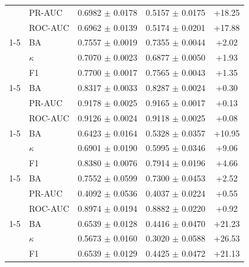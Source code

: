 \begin{table}[tbp]
\begin{tabular}{@{}l l c c c@{}}
 & PR-AUC & 0.6982 $\pm$ 0.0178 & 0.5157 $\pm$ 0.0175 & +18.25 \\
 & ROC-AUC & 0.6962 $\pm$ 0.0139 & 0.5174 $\pm$ 0.0201 & +17.88 \\
\cmidrule(lr){1-5}
\multirow{3}{*}{HMC} & BA & 0.7557 $\pm$ 0.0019 & 0.7355 $\pm$ 0.0044 & +2.02 \\
 & $\kappa$ & 0.7070 $\pm$ 0.0023 & 0.6877 $\pm$ 0.0050 & +1.93 \\
 & F1 & 0.7700 $\pm$ 0.0017 & 0.7565 $\pm$ 0.0043 & +1.35 \\
\cmidrule(lr){1-5}
\multirow{3}{*}{TUAB} & BA & 0.8317 $\pm$ 0.0033 & 0.8287 $\pm$ 0.0024 & +0.30 \\
 & PR-AUC & 0.9178 $\pm$ 0.0025 & 0.9165 $\pm$ 0.0017 & +0.13 \\
 & ROC-AUC & 0.9126 $\pm$ 0.0024 & 0.9118 $\pm$ 0.0025 & +0.08 \\
\cmidrule(lr){1-5}
\multirow{3}{*}{TUEV} & BA & 0.6423 $\pm$ 0.0164 & 0.5328 $\pm$ 0.0357 & +10.95 \\
 & $\kappa$ & 0.6901 $\pm$ 0.0190 & 0.5995 $\pm$ 0.0346 & +9.06 \\
 & F1 & 0.8380 $\pm$ 0.0076 & 0.7914 $\pm$ 0.0196 & +4.66 \\
\cmidrule(lr){1-5}
\multirow{3}{*}{CHB-MIT} & BA & 0.7552 $\pm$ 0.0599 & 0.7300 $\pm$ 0.0453 & +2.52 \\
 & PR-AUC & 0.4092 $\pm$ 0.0536 & 0.4037 $\pm$ 0.0224 & +0.55 \\
 & ROC-AUC & 0.8974 $\pm$ 0.0194 & 0.8882 $\pm$ 0.0220 & +0.92 \\
\cmidrule(lr){1-5}
\multirow{3}{*}{BCIC2020-3} & BA & 0.6539 $\pm$ 0.0128 & 0.4416 $\pm$ 0.0470 & +21.23 \\
 & $\kappa$ & 0.5673 $\pm$ 0.0160 & 0.3020 $\pm$ 0.0588 & +26.53 \\
 & F1 & 0.6539 $\pm$ 0.0129 & 0.4425 $\pm$ 0.0472 & +21.13 \\
\bottomrule\end{tabular}\end{table}

